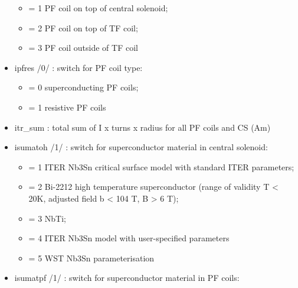 \documentclass[]{article}
\begin{document}
\begin{itemize}
  \begin{itemize}
  \itemsep1pt\parskip0pt
  \item
    = 1 PF coil on top of central solenoid;
  \item
    = 2 PF coil on top of TF coil;
  \item
    = 3 PF coil outside of TF coil
  \end{itemize}
\item
  ipfres /0/ : switch for PF coil type:

  \begin{itemize}
  \itemsep1pt\parskip0pt
  \item
    = 0 superconducting PF coils;
  \item
    = 1 resistive PF coils
  \end{itemize}
\item
  itr\_sum : total sum of I x turns x radius for all PF coils and CS
  (Am)
\item
  isumatoh /1/ : switch for superconductor material in central solenoid:

  \begin{itemize}
  \itemsep1pt\parskip0pt
  \item
    = 1 ITER Nb3Sn critical surface model with standard ITER parameters;
  \item
    = 2 Bi-2212 high temperature superconductor (range of validity T
    \textless{} 20K, adjusted field b \textless{} 104 T, B
    \textgreater{} 6 T);
  \item
    = 3 NbTi;
  \item
    = 4 ITER Nb3Sn model with user-specified parameters
  \item
    = 5 WST Nb3Sn parameterisation
  \end{itemize}
\item
  isumatpf /1/ : switch for superconductor material in PF coils:


\end{itemize}
\end{document}
